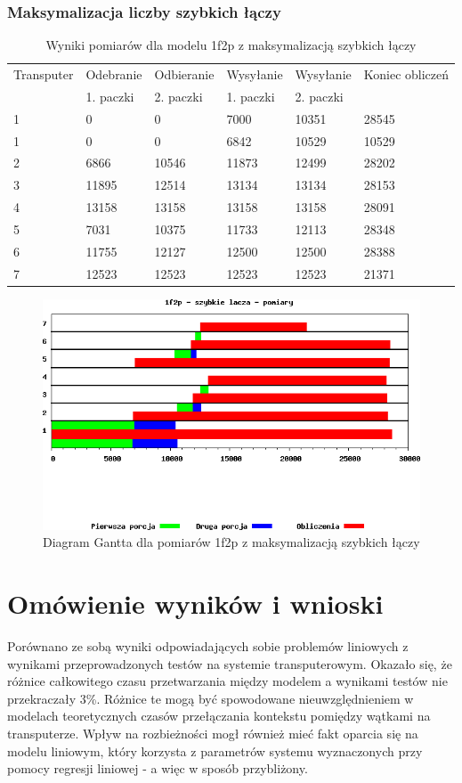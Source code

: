 \documentclass[a4paper,11pt, titlepage]{article}
\begin{document}
\subsubsection{Maksymalizacja liczby szybkich łączy}
\begin{table}[hp!]
\begin{tabular}{|l|l|l|l|l|l|}\hline
Transputer&Odebranie&Odbieranie&Wysyłanie&Wysyłanie&Koniec obliczeń\\
&1. paczki&2. paczki&1. paczki&2. paczki&\\ \hline
1&0&0&7000&10351&28545\\ \hline
1&0&0&6842&10529&10529\\ \hline
2&6866&10546&11873&12499&28202\\ \hline
3&11895&12514&13134&13134&28153\\ \hline
4&13158&13158&13158&13158&28091\\ \hline
5&7031&10375&11733&12113&28348\\ \hline
6&11755&12127&12500&12500&28388\\ \hline
7&12523&12523&12523&12523&21371\\ \hline
\end{tabular}
\caption{Wyniki pomiarów dla modelu 1f2p z maksymalizacją szybkich łączy \label{i2f1p_l}}
\end{table}
\begin{figure}[hp!]
\includegraphics[width=1.0\textwidth]{wykresy/i2p1f_lacza}
\caption{Diagram Gantta dla pomiarów 1f2p z maksymalizacją szybkich łączy \label{i2p1f_lg}}
\end{figure}
\section{Omówienie wyników  i wnioski}
Porównano ze sobą wyniki odpowiadających sobie problemów liniowych z wynikami przeprowadzonych testów na systemie transputerowym. Okazało się, że różnice całkowitego czasu przetwarzania między modelem a wynikami testów nie przekraczały 3\%. Różnice te mogą być spowodowane nieuwzględnieniem w modelach teoretycznych czasów przełączania kontekstu pomiędzy wątkami na transputerze. Wpływ na rozbieżności mogł również mieć fakt oparcia się na modelu liniowym, który korzysta z parametrów systemu wyznaczonych przy pomocy regresji liniowej - a więc w sposób przybliżony.
\end{document}
